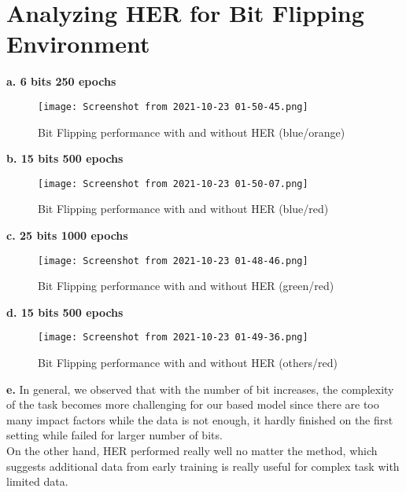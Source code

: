 \documentclass[]{article}
\begin{document}
	\section{Analyzing HER for Bit Flipping Environment}
	\textbf{a. 6 bits 250 epochs} \\
	\begin{center} 
		\begin{figure}[H]
			\centering
			\texttt{[image: Screenshot from 2021-10-23 01-50-45.png]}
			\caption{Bit Flipping performance with and without HER (blue/orange)}
		\end{figure}
	\end{center}
	\textbf{b. 15 bits 500 epochs} \\
	\begin{center} 
		\begin{figure}[H]
			\centering
			\texttt{[image: Screenshot from 2021-10-23 01-50-07.png]}
			\caption{Bit Flipping performance with and without HER (blue/red)}
		\end{figure}
	\end{center}
	\textbf{c. 25 bits 1000 epochs} \\
	\begin{center} 
		\begin{figure}[H]
			\centering
			\texttt{[image: Screenshot from 2021-10-23 01-48-46.png]}
			\caption{Bit Flipping performance with and without HER (green/red)}
		\end{figure}
	\end{center}
	\textbf{d. 15 bits 500 epochs} \\
	\begin{center} 
		\begin{figure}[H]
			\centering
			\texttt{[image: Screenshot from 2021-10-23 01-49-36.png]}
			\caption{Bit Flipping performance with and without HER (others/red)}
		\end{figure}
	\end{center}
	\textbf{e.} 
	In general, we observed that with the number of bit increases, the complexity of the task becomes more challenging for our based model since there are too many impact factors while the data is not enough, it hardly finished on the first setting while failed for larger number of bits. \\
	On the other hand, HER performed really well no matter the method, which suggests additional data from early training is really useful for complex task with limited data.
	
\end{document}
